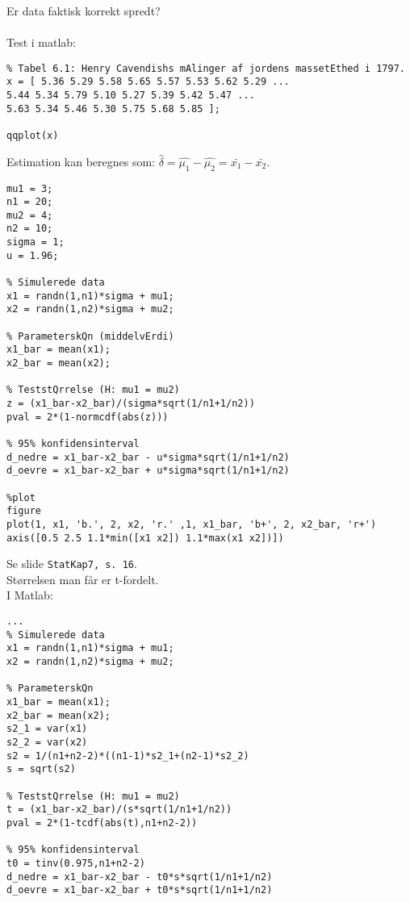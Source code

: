\documentclass[Main]{subfiles}
\begin{document}
\begin{theo}[Fraktilsammenligning]
Er data faktisk korrekt spredt?
\\
\\
Test i matlab:
\\
\begin{lstlisting}[style=Code-Matlab]
%% Eksempel 4 - t-test: jordens massefylde
% Tabel 6.1: Henry Cavendishs mAlinger af jordens massetEthed i 1797.
x = [ 5.36 5.29 5.58 5.65 5.57 5.53 5.62 5.29 ...
5.44 5.34 5.79 5.10 5.27 5.39 5.42 5.47 ...
5.63 5.34 5.46 5.30 5.75 5.68 5.85 ];

qqplot(x)
\end{lstlisting}
\end{theo}


\begin{theo}[Estimation]
Estimation kan beregnes som: $\hat{\delta} = \hat{\mu_1} - \hat{\mu_2} = \bar{x_1}-\bar{x_2}$.

\begin{lstlisting}[style=Code-Matlab]
%% Eksempel 1 - sammenligning af to middelvErdier (kendt varians)
mu1 = 3;
n1 = 20;
mu2 = 4;
n2 = 10;
sigma = 1;
u = 1.96;

% Simulerede data
x1 = randn(1,n1)*sigma + mu1;
x2 = randn(1,n2)*sigma + mu2;

% ParameterskQn (middelvErdi)
x1_bar = mean(x1);
x2_bar = mean(x2);

% TeststQrrelse (H: mu1 = mu2)
z = (x1_bar-x2_bar)/(sigma*sqrt(1/n1+1/n2))
pval = 2*(1-normcdf(abs(z)))

% 95% konfidensinterval
d_nedre = x1_bar-x2_bar - u*sigma*sqrt(1/n1+1/n2)
d_oevre = x1_bar-x2_bar + u*sigma*sqrt(1/n1+1/n2)

%plot
figure
plot(1, x1, 'b.', 2, x2, 'r.' ,1, x1_bar, 'b+', 2, x2_bar, 'r+')
axis([0.5 2.5 1.1*min([x1 x2]) 1.1*max(x1 x2])])

\end{lstlisting}
\end{theo}


\begin{theo}
Se slide \texttt{StatKap7, s. 16}.
\\
Størrelsen man får er t-fordelt. 
\\I Matlab:
\\ 
\begin{lstlisting}[style=Code-Matlab]
%% Eksempel 2 - sammenligning af to middelvErdier (ukendt varians)
...
% Simulerede data
x1 = randn(1,n1)*sigma + mu1;
x2 = randn(1,n2)*sigma + mu2;

% ParameterskQn
x1_bar = mean(x1);
x2_bar = mean(x2);
s2_1 = var(x1)
s2_2 = var(x2)
s2 = 1/(n1+n2-2)*((n1-1)*s2_1+(n2-1)*s2_2)
s = sqrt(s2)

% TeststQrrelse (H: mu1 = mu2)
t = (x1_bar-x2_bar)/(s*sqrt(1/n1+1/n2))
pval = 2*(1-tcdf(abs(t),n1+n2-2))

% 95% konfidensinterval
t0 = tinv(0.975,n1+n2-2)
d_nedre = x1_bar-x2_bar - t0*s*sqrt(1/n1+1/n2)
d_oevre = x1_bar-x2_bar + t0*s*sqrt(1/n1+1/n2)
\end{lstlisting}

\end{theo}
\end{document}
